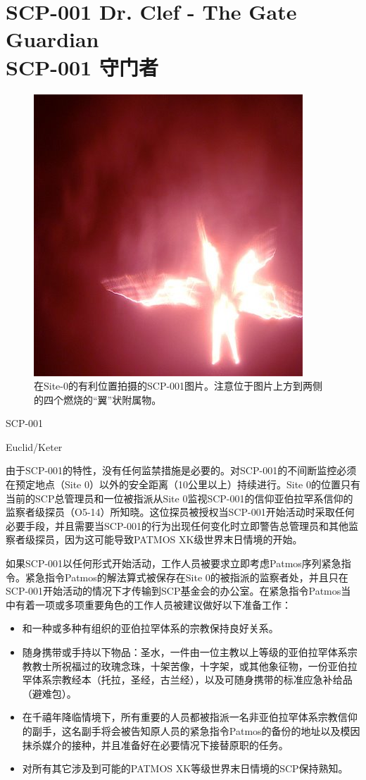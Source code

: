 \chapter[SCP-001 守门者]{
	SCP-001 Dr. Clef - The Gate Guardian \\
	SCP-001 守门者
}

\label{chap:SCP-001.the.gate.guardian}

\begin{figure}[H]
    \centering
    \includegraphics[width=0.5\linewidth]{images/SCP.001.the.gate.guardian.jpg}
    \caption*{在Site-0的有利位置拍摄的SCP-001图片。注意位于图片上方到两侧的四个燃烧的“翼”状附属物。}
\end{figure}

SCP-001

Euclid\slash Keter

由于SCP-001的特性，没有任何监禁措施是必要的。对SCP-001的不间断监控必须在预定地点（Site 0）以外的安全距离（10公里以上）持续进行。Site 0的位置只有当前的SCP总管理员和一位被指派从Site 0监视SCP-001的信仰亚伯拉罕系信仰的监察者级探员（O5-14）所知晓。这位探员被授权当SCP-001开始活动时采取任何必要手段，并且需要当SCP-001的行为出现任何变化时立即警告总管理员和其他监察者级探员，因为这可能导致PATMOS XK级世界末日情境的开始。

如果SCP-001以任何形式开始活动，工作人员被要求立即考虑Patmos序列紧急指令。紧急指令Patmos的解法算式被保存在Site 0的被指派的监察者处，并且只在SCP-001开始活动的情况下才传输到SCP基金会的办公室。在紧急指令Patmos当中有着一项或多项重要角色的工作人员被建议做好以下准备工作：

\begin{itemize}
\item 和一种或多种有组织的亚伯拉罕体系的宗教保持良好关系。
\item 随身携带或手持以下物品：圣水，一件由一位主教以上等级的亚伯拉罕体系宗教教士所祝福过的玫瑰念珠，十架苦像，十字架，或其他象征物，一份亚伯拉罕体系宗教经本（托拉，圣经，古兰经），以及可随身携带的标准应急补给品（避难包）。
\item 在千禧年降临情境下，所有重要的人员都被指派一名非亚伯拉罕体系宗教信仰的副手，这名副手将会被告知原人员的紧急指令Patmos的备份的地址以及模因抹杀媒介的接种，并且准备好在必要情况下接替原职的任务。
\item 对所有其它涉及到可能的PATMOS XK等级世界末日情境的SCP保持熟知。
\end{itemize}

